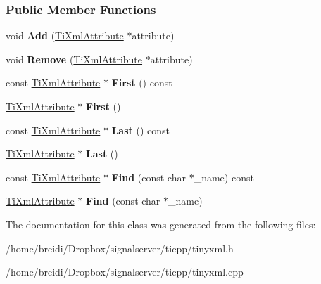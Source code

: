 \subsubsection*{Public Member Functions}
\begin{DoxyCompactItemize}
\item 
\hypertarget{class_ti_xml_attribute_set_a745e50ddaae3bee93e4589321e0b9c1a}{
void {\bfseries Add} (\hyperlink{class_ti_xml_attribute}{TiXmlAttribute} $\ast$attribute)}
\label{class_ti_xml_attribute_set_a745e50ddaae3bee93e4589321e0b9c1a}

\item 
\hypertarget{class_ti_xml_attribute_set_a924a73d071f2573f9060f0be57879c57}{
void {\bfseries Remove} (\hyperlink{class_ti_xml_attribute}{TiXmlAttribute} $\ast$attribute)}
\label{class_ti_xml_attribute_set_a924a73d071f2573f9060f0be57879c57}

\item 
\hypertarget{class_ti_xml_attribute_set_ae0636e88cedd4b09d61c451860f68598}{
const \hyperlink{class_ti_xml_attribute}{TiXmlAttribute} $\ast$ {\bfseries First} () const }
\label{class_ti_xml_attribute_set_ae0636e88cedd4b09d61c451860f68598}

\item 
\hypertarget{class_ti_xml_attribute_set_a99703bb08ca2aece2d7ef835de339ba0}{
\hyperlink{class_ti_xml_attribute}{TiXmlAttribute} $\ast$ {\bfseries First} ()}
\label{class_ti_xml_attribute_set_a99703bb08ca2aece2d7ef835de339ba0}

\item 
\hypertarget{class_ti_xml_attribute_set_a7b3f3ccf39a97bc25539d3fcc540296a}{
const \hyperlink{class_ti_xml_attribute}{TiXmlAttribute} $\ast$ {\bfseries Last} () const }
\label{class_ti_xml_attribute_set_a7b3f3ccf39a97bc25539d3fcc540296a}

\item 
\hypertarget{class_ti_xml_attribute_set_ab4c4edfb2d74f6ea31aae096743bd6e0}{
\hyperlink{class_ti_xml_attribute}{TiXmlAttribute} $\ast$ {\bfseries Last} ()}
\label{class_ti_xml_attribute_set_ab4c4edfb2d74f6ea31aae096743bd6e0}

\item 
\hypertarget{class_ti_xml_attribute_set_aacbbc5e1a1c987e72815430e89fcb58b}{
const \hyperlink{class_ti_xml_attribute}{TiXmlAttribute} $\ast$ {\bfseries Find} (const char $\ast$\_\-name) const }
\label{class_ti_xml_attribute_set_aacbbc5e1a1c987e72815430e89fcb58b}

\item 
\hypertarget{class_ti_xml_attribute_set_a2f210bed54c832adf1683c44c35727b9}{
\hyperlink{class_ti_xml_attribute}{TiXmlAttribute} $\ast$ {\bfseries Find} (const char $\ast$\_\-name)}
\label{class_ti_xml_attribute_set_a2f210bed54c832adf1683c44c35727b9}

\end{DoxyCompactItemize}


The documentation for this class was generated from the following files:\begin{DoxyCompactItemize}
\item 
/home/breidi/Dropbox/signalserver/ticpp/tinyxml.h\item 
/home/breidi/Dropbox/signalserver/ticpp/tinyxml.cpp\end{DoxyCompactItemize}
